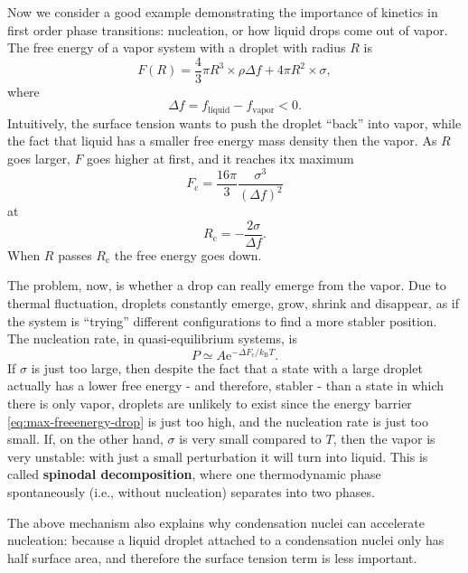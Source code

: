 \documentclass[hyperref, a4paper]{article}
\newcommand*{\ee}{\mathrm{e}}
\newcommand*{\concept}[1]{{\textbf{#1}}}
\begin{document}
Now we consider a good example demonstrating the importance of kinetics in first order phase transitions: nucleation, or how liquid drops come out of vapor.
The free energy of a vapor system with a droplet with radius $R$ is 
\begin{equation}
    F(R) = \frac{4}{3} \pi R^3 \times \rho \Delta f + 4 \pi R^2 \times \sigma,
\end{equation}
where 
\begin{equation}
    \Delta f = f_\text{liquid} - f_\text{vapor} < 0.
\end{equation}
Intuitively, the surface tension wants to push the droplet ``back'' into vapor, while the fact that liquid has a smaller free energy mass density then the vapor.
As $R$ goes larger, $F$ goes higher at first, and it reaches itx maximum 
\begin{equation}
    F_\text{c} = \frac{16\pi}{3} \frac{\sigma^3}{(\Delta f)^2}
    \label{eq:max-freeenergy-drop}
\end{equation}
at 
\begin{equation}
    R_\text{c} = - \frac{2\sigma}{\Delta f}.
\end{equation}
When $R$ passes $R_\text{c}$ the free energy goes down.

The problem, now, is whether a drop can really emerge from the vapor.
Due to thermal fluctuation, droplets constantly emerge, grow, shrink and disappear, as if the system is ``trying'' different configurations to find a more stabler position.
The nucleation rate, in quasi-equilibrium systems, is 
\begin{equation}
    P \simeq A \ee^{- \Delta F_\text{c} / k_\text{B} T}.
\end{equation}
If $\sigma$ is just too large, then despite the fact that a state with a large droplet actually has a lower free energy - and therefore, stabler - than a state in which there is only vapor, droplets are unlikely to exist since the energy barrier \eqref{eq:max-freeenergy-drop} is just too high, and the nucleation rate is just too small.
If, on the other hand, $\sigma$ is very small compared to $T$, then the vapor is very unstable: with just a small perturbation it will turn into liquid.
This is called \concept{spinodal decomposition}, where one thermodynamic phase spontaneously (i.e., without nucleation) separates into two phases.

The above mechanism also explains why condensation nuclei can accelerate nucleation: because a liquid droplet attached to a condensation nuclei only has half surface area, and therefore the surface tension term is less important. 
\end{document}
